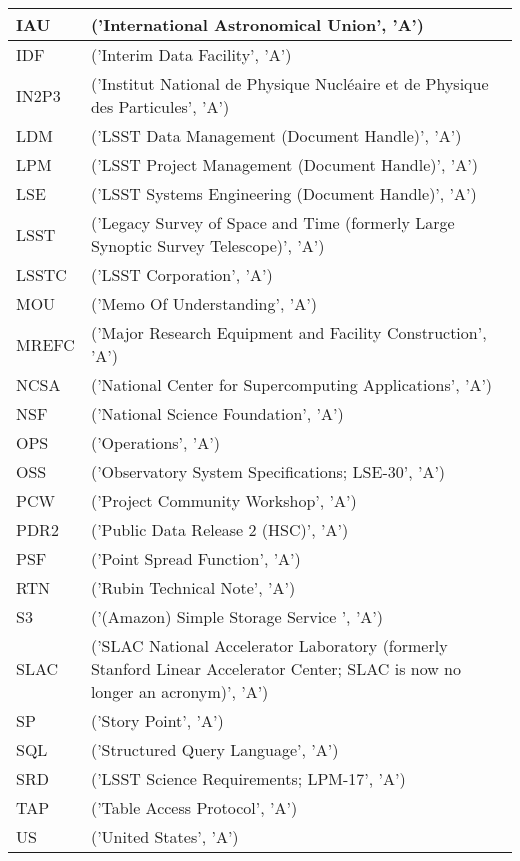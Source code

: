 \begin{longtable}{p{}p{}}
IAU & ('International Astronomical Union', 'A') \\\hline
IDF & ('Interim Data Facility', 'A') \\\hline
IN2P3 & ('Institut National de Physique Nucléaire et de Physique des Particules', 'A') \\\hline
LDM & ('LSST Data Management (Document Handle)', 'A') \\\hline
LPM & ('LSST Project Management (Document Handle)', 'A') \\\hline
LSE & ('LSST Systems Engineering (Document Handle)', 'A') \\\hline
LSST & ('Legacy Survey of Space and Time (formerly Large Synoptic Survey Telescope)', 'A') \\\hline
LSSTC & ('LSST Corporation', 'A') \\\hline
MOU & ('Memo Of Understanding', 'A') \\\hline
MREFC & ('Major Research Equipment and Facility Construction', 'A') \\\hline
NCSA & ('National Center for Supercomputing Applications', 'A') \\\hline
NSF & ('National Science Foundation', 'A') \\\hline
OPS & ('Operations', 'A') \\\hline
OSS & ('Observatory System Specifications; LSE-30', 'A') \\\hline
PCW & ('Project Community Workshop', 'A') \\\hline
PDR2 & ('Public Data Release 2 (HSC)', 'A') \\\hline
PSF & ('Point Spread Function', 'A') \\\hline
RTN & ('Rubin Technical Note', 'A') \\\hline
S3 & ('(Amazon) Simple Storage Service ', 'A') \\\hline
SLAC & ('SLAC National Accelerator Laboratory (formerly Stanford Linear Accelerator Center; SLAC is now no longer an acronym)', 'A') \\\hline
SP & ('Story Point', 'A') \\\hline
SQL & ('Structured Query Language', 'A') \\\hline
SRD & ('LSST Science Requirements; LPM-17', 'A') \\\hline
TAP & ('Table Access Protocol', 'A') \\\hline
US & ('United States', 'A') \\\hline
\end{longtable}
